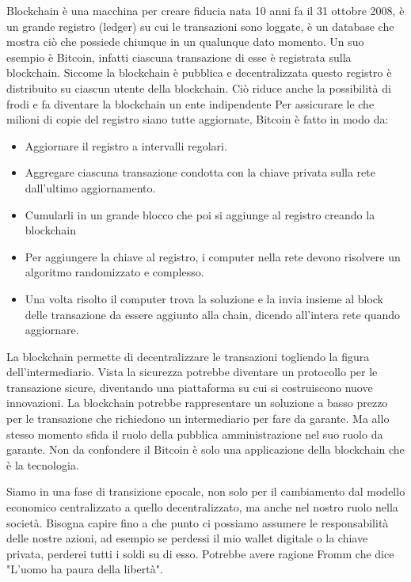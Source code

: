 \documentclass[a4page, 11pt]{article}
\begin{document}

Blockchain è una macchina per creare fiducia nata 10 anni fa il 31 ottobre 2008, è un grande registro (ledger) su cui le transazioni sono loggate, è un database che mostra ciò che possiede chiunque in un qualunque dato momento.
Un suo esempio è Bitcoin, infatti ciascuna transazione di esse è registrata sulla blockchain. 
Siccome la blockchain è pubblica e decentralizzata questo registro è distribuito su ciascun utente della blockchain. 
Ciò riduce anche la possibilità di frodi e fa diventare la blockchain un ente indipendente
Per assicurare le che milioni di copie del registro siano tutte aggiornate, Bitcoin è fatto in modo da:
\begin{itemize}
	\item Aggiornare il registro a intervalli regolari.
	\item Aggregare ciascuna transazione condotta con la chiave privata sulla rete dall’ultimo aggiornamento.
	\item Cumularli in un grande blocco che poi si aggiunge al registro creando la blockchain
	\item Per aggiungere la chiave al registro, i computer nella rete devono risolvere un algoritmo randomizzato e complesso.
	\item Una volta risolto il computer trova la soluzione e la invia insieme al block delle transazione da essere aggiunto alla chain, dicendo all’intera rete quando aggiornare.
\end{itemize}
La blockchain permette di decentralizzare le transazioni togliendo la figura dell’intermediario.
Vista la sicurezza potrebbe diventare un protocollo per le transazione sicure, diventando una piattaforma su cui si costruiscono nuove innovazioni. 
La blockchain potrebbe rappresentare un soluzione a basso prezzo per le transazione che richiedono un intermediario per fare da garante. Ma allo stesso momento sfida il ruolo della pubblica amministrazione nel suo ruolo da garante.
Non da confondere il Bitcoin è solo una applicazione della blockchain che è la tecnologia. 

Siamo in una fase di transizione epocale, non solo per il cambiamento dal modello economico centralizzato a quello decentralizzato, ma anche nel nostro ruolo nella società. 
Bisogna capire fino a che punto ci possiamo assumere le responsabilità delle nostre azioni, ad esempio se perdessi il mio wallet digitale o la chiave privata, perderei tutti i soldi su di esso. 
Potrebbe avere ragione Fromm che dice "L'uomo ha paura della libertà".
\end{document}
